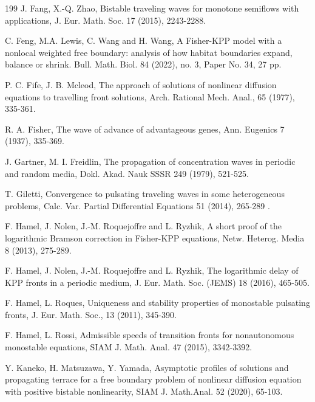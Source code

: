 \documentclass[11pt]{amsart}
\numberwithin{equation}{section}
\begin{document}
\begin{thebibliography}{199}
 J. Fang,  X.-Q. Zhao, Bistable traveling waves for monotone semiflows with applications, J. Eur. Math. Soc.  17 (2015),  2243-2288.

C. Feng, M.A. Lewis, C. Wang and H.  Wang,  A Fisher-KPP model with a nonlocal weighted free boundary: analysis of how habitat boundaries expand, balance or shrink. Bull. Math. Biol. 84 (2022), no. 3, Paper No. 34, 27 pp.

P. C. Fife, J. B. Mcleod,
The approach of solutions of nonlinear diffusion equations to travelling front solutions,
Arch. Rational Mech. Anal., 65 (1977),   335-361.


R. A. Fisher, The wave of advance of advantageous genes, Ann. Eugenics 7 (1937), 335-369.


J. Gartner, M. I. Freidlin, The propagation of concentration waves in periodic and random media, Dokl. Akad. Nauk SSSR 249 (1979), 521-525.

T. Giletti,  Convergence to pulsating traveling waves in some heterogeneous problems, Calc. Var. Partial Differential Equations 51 (2014), 265-289 .



 F. Hamel, J. Nolen, J.-M. Roquejoffre and L. Ryzhik, A short proof of the logarithmic Bramson correction in Fisher-KPP equations, Netw. Heterog. Media 8 (2013), 275-289.

F. Hamel, J. Nolen, J.-M. Roquejoffre and L. Ryzhik, The logarithmic delay of KPP fronts in a periodic medium, J. Eur. Math. Soc. (JEMS) 18 (2016),  465-505.

F. Hamel, L. Roques, Uniqueness and stability properties of monostable pulsating fronts,  J. Eur. Math. Soc., 13 (2011),  345-390.


F. Hamel, L. Rossi,
Admissible speeds of transition fronts for nonautonomous monostable equations, SIAM J. Math. Anal. 47 (2015), 3342-3392.


Y. Kaneko, H. Matsuzawa, Y. Yamada, Asymptotic profiles of solutions and propagating terrace for a free boundary problem of nonlinear diffusion equation with positive bistable nonlinearity, SIAM J. Math.Anal. 52 (2020), 65-103.



\end{thebibliography}
\end{document}
